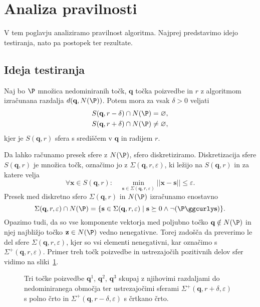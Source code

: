 \section{Analiza pravilnosti}
\label{sec:analiza_pravilnosti}
V tem poglavju analiziramo pravilnost algoritma. Najprej predstavimo idejo testiranja, nato pa postopek ter rezultate. 

\subsection{Ideja testiranja}
Naj bo $\P$ množica nedominiranih točk, $\textbf{q}$ točka poizvedbe in $r$ z algoritmom izračunana razdalja $d(\textbf{q}, N(\P))$. Potem mora za vsak $\delta > 0$ veljati
\begin{align*}
    &S(\textbf{q}, r - \delta) \cap N(\P) = \varnothing, \\
    &S(\textbf{q}, r + \delta) \cap N(\P) \neq \varnothing,
\end{align*}
kjer je $S(\textbf{q}, r)$ sfera s središčem v $\textbf{q}$ in radijem $r$. 

Da lahko računamo presek sfere z $N(\P)$, sfero diskretiziramo. Diskretizacija sfere $S(\textbf{q}, r)$ je množica točk, označimo jo z $\Sigma(\textbf{q}, r, \varepsilon)$, ki ležijo na $S(\textbf{q}, r)$ in za katere velja
\[
\forall \textbf{x} \in S(\textbf{q}, r): \quad \min_{\textbf{s} \in \Sigma(\textbf{q}, r, \varepsilon)} ||\textbf{x} - \textbf{s}|| \leq \varepsilon.
\]
Presek med diskretno sfero $\Sigma(\textbf{q}, r)$ in $N(\P)$ izračunamo enostavno
\[
\Sigma(\textbf{q}, r, \varepsilon) \cap N(\P) = \{ \textbf{s} \in \Sigma(\textbf{q}, r, \varepsilon) \mid \textbf{s} \succeq 0 \land \neg  (\P \ggcurly \textbf{s}) \}.
\]
Opazimo tudi, da so vse komponente vektorja med poljubno točko $\textbf{q} \notin N(\P)$ in njej najbližjo točko $\textbf{z} \in N(\P)$ vedno nenegativne. Torej zadošča da preverimo le del sfere $\Sigma(\textbf{q}, r, \varepsilon)$, kjer so vsi elementi nenegativni, kar označimo s $\Sigma^+(\textbf{q}, r, \varepsilon)$.
Primer treh točk poizvedbe in ustrezajočih pozitivnih delov sfer vidimo na sliki~\ref{fig:test_example}.
\begin{figure}[ht]
  \centering
  
  \caption{Tri točke poizvedbe $\textbf{q}^1$, $\textbf{q}^2$, $\textbf{q}^3$ skupaj z njihovimi razdaljami do nedominiranega območja ter ustrezajočimi sferami $\Sigma^+(\textbf{q}, r + \delta, \varepsilon)$ s polno črto in $\Sigma^+(\textbf{q}, r - \delta, \varepsilon)$ s črtkano črto.}
  \label{fig:test_example}
\end{figure}

